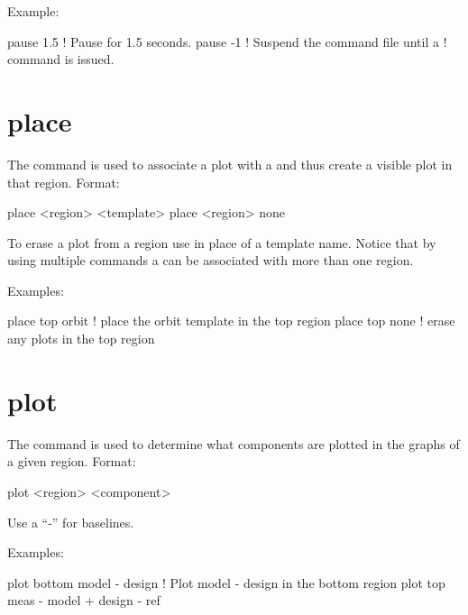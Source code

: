 Example:
\begin{example}
  pause 1.5    ! Pause for 1.5 seconds.
  pause -1     ! Suspend the command file until a  
               !   command is issued.
\end{example}

\section{place}
\label{s:place}

The  command is used to associate a  plot
with a  and thus create a visible plot in that region. Format:
\begin{example}
  place <region> <template>
  place <region> none
\end{example}

\vskip 0.2in 

To erase a plot from a region use  in place of a template
name. Notice that by using multiple  commands a
 can be associated with more than one region.

Examples:
\begin{example}
  place top orbit  ! place the orbit template in the top region
  place top none   ! erase any plots in the top region
\end{example}

\section{plot}
\label{s:plot}

The  command is used to determine what components are plotted
in the graphs of a given region. Format:
\begin{example}
  plot <region> <component>
\end{example}

\vskip 0.2in 

Use a ``-'' for baselines. 

Examples:
\begin{example}
  plot bottom model - design       ! Plot model - design in the bottom region
  plot top meas - model + design - ref 
\end{example}

